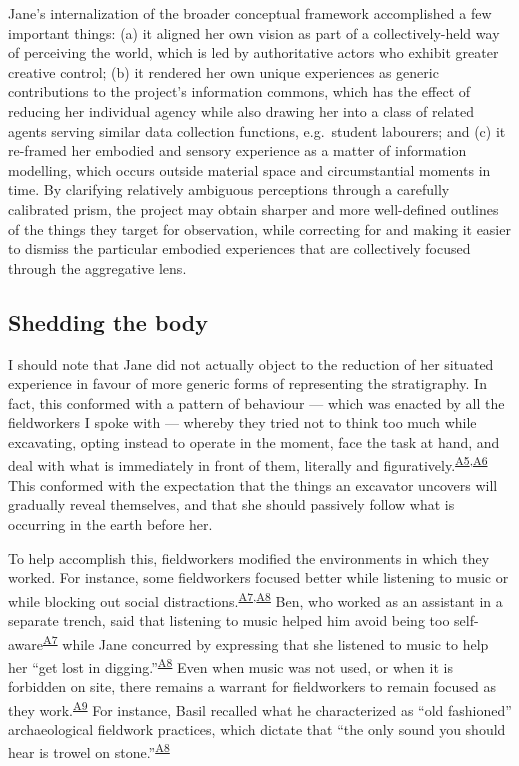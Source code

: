 \documentclass{article}
\begin{document}
Jane's internalization of the broader conceptual framework accomplished
a few important things: (a) it aligned her own vision as part of a
collectively-held way of perceiving the world, which is led by
authoritative actors who exhibit greater creative control; (b) it
rendered her own unique experiences as generic contributions to the
project's information commons, which has the effect of reducing her
individual agency while also drawing her into a class of related agents
serving similar data collection functions, e.g.~student labourers; and
(c) it re-framed her embodied and sensory experience as a matter of
information modelling, which occurs outside material space and
circumstantial moments in time. By clarifying relatively ambiguous
perceptions through a carefully calibrated prism, the project may obtain
sharper and more well-defined outlines of the things they target for
observation, while correcting for and making it easier to dismiss the
particular embodied experiences that are collectively focused through
the aggregative lens.

\subsection{Shedding the body}\label{shedding-the-body}

I should note that Jane did not actually object to the reduction of her
situated experience in favour of more generic forms of representing the
stratigraphy. In fact, this conformed with a pattern of behaviour ---
which was enacted by all the fieldworkers I spoke with --- whereby they
tried not to think too much while excavating, opting instead to operate
in the moment, face the task at hand, and deal with what is immediately
in front of them, literally and
figuratively.\textsuperscript{\hyperref[sec-A5]{A5},\hyperref[sec-A6]{A6}}
This conformed with the expectation that the things an excavator
uncovers will gradually reveal themselves, and that she should passively
follow what is occurring in the earth before her.

To help accomplish this, fieldworkers modified the environments in which
they worked. For instance, some fieldworkers focused better while
listening to music or while blocking out social
distractions.\textsuperscript{\hyperref[sec-A7]{A7},\hyperref[sec-A8]{A8}}
Ben, who worked as an assistant in a separate trench, said that
listening to music helped him avoid being too
self-aware\textsuperscript{\hyperref[sec-A7]{A7}} while Jane concurred
by expressing that she listened to music to help her ``get lost in
digging.''\textsuperscript{\hyperref[sec-A8]{A8}} Even when music was
not used, or when it is forbidden on site, there remains a warrant for
fieldworkers to remain focused as they
work.\textsuperscript{\hyperref[sec-A9]{A9}} For instance, Basil
recalled what he characterized as ``old fashioned'' archaeological
fieldwork practices, which dictate that ``the only sound you should hear
is trowel on stone.''\textsuperscript{\hyperref[sec-A8]{A8}}
\end{document}
